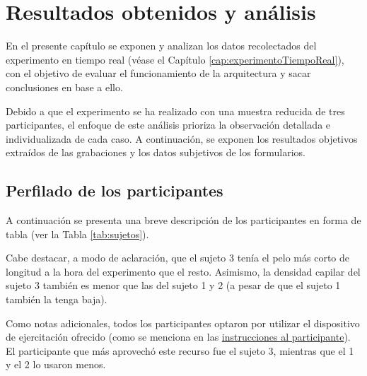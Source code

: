 \chapter{Resultados obtenidos y análisis}
\label{cap:rt_resultados_y_analisis}

En el presente capítulo se exponen y analizan los datos recolectados del experimento en tiempo real (véase el Capítulo \ref{cap:experimentoTiempoReal}), con el objetivo de evaluar el funcionamiento de la arquitectura y sacar conclusiones en base a ello.

Debido a que el experimento se ha realizado con una muestra reducida de tres
participantes, el enfoque de este análisis prioriza la observación detallada e
individualizada de cada caso. A continuación, se exponen los resultados
objetivos extraídos de las grabaciones y los datos subjetivos de los
formularios.

\section{Perfilado de los participantes}
\label{sec:rt_perfiles}

A continuación se presenta una breve descripción de los participantes en forma
de tabla (ver la Tabla \ref{tab:sujetos}).

Cabe destacar, a modo de aclaración, que el sujeto 3 tenía el pelo más corto de
longitud a la hora del experimento que el resto. Asimismo, la densidad capilar
del sujeto 3 también es menor que las del sujeto 1 y 2 (a pesar de que el
sujeto 1 también la tenga baja).

Como notas adicionales, todos los participantes optaron por utilizar el
dispositivo de ejercitación ofrecido (como se menciona en las
\hyperref[subsec:rt_instrucciones]{instrucciones al participante}). El
participante que más aprovechó este recurso fue el sujeto 3, mientras que el 1
y el 2 lo usaron menos.

